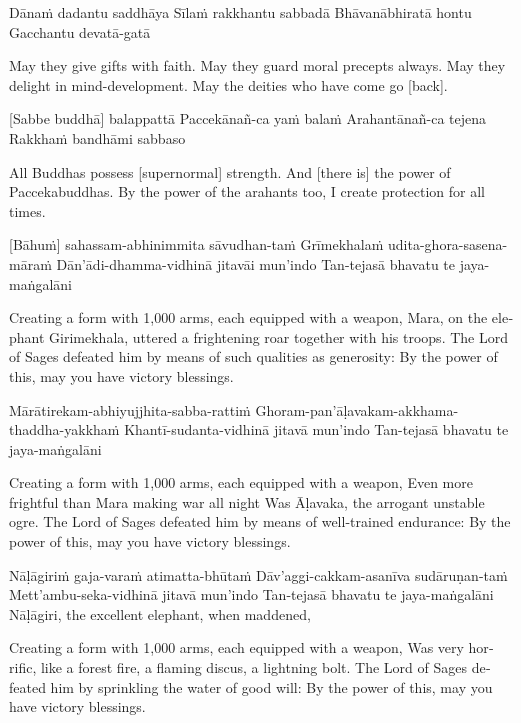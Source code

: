 Dānaṁ dadantu saddhāya
Sīlaṁ rakkhantu sabbadā
Bhāvanābhiratā hontu
Gacchantu devatā-gatā

\begin{english}
  May they give gifts with faith.
  May they guard moral precepts always.
  May they delight in mind-development.
  May the deities who have come go [back].
\end{english}

[Sabbe buddhā] balappattā
Paccekānañ-ca yaṁ balaṁ
Arahantānañ-ca tejena
Rakkhaṁ bandhāmi sabbaso

\begin{english}
  All Buddhas possess [supernormal] strength.
  And [there is] the power of Paccekabuddhas.
  By the power of the arahants too,
  I create protection for all times.
\end{english}

\suttaRef{[MJG]}

[Bāhuṁ] sahassam-abhinimmita sāvudhan-taṁ
Grīmekhalaṁ udita-ghora-sasena-māraṁ
Dān’ādi-dhamma-vidhinā jitavāi mun’indo
Tan-tejasā bhavatu te jaya-maṅgalāni

\begin{english}
  Creating a form with 1,000 arms, each equipped with a weapon,
  Mara, on the elephant Girimekhala, uttered a frightening roar together with his troops.
  The Lord of Sages defeated him by means of such qualities as generosity:
  By the power of this, may you have victory blessings.
\end{english}

Mārātirekam-abhiyujjhita-sabba-rattiṁ
Ghoram-pan’āḷavakam-akkhama-thaddha-yakkhaṁ
Khantī-sudanta-vidhinā jitavā mun’indo
Tan-tejasā bhavatu te jaya-maṅgalāni

\begin{english}
  Creating a form with 1,000 arms, each equipped with a weapon,
  Even more frightful than Mara making war all night
  Was Āḷavaka, the arrogant unstable ogre.
  The Lord of Sages defeated him by means of well-trained endurance:
  By the power of this, may you have victory blessings.
\end{english}

Nāḷāgiriṁ gaja-varaṁ atimatta-bhūtaṁ
Dāv’aggi-cakkam-asanīva sudāruṇan-taṁ
Mett’ambu-seka-vidhinā jitavā mun’indo
Tan-tejasā bhavatu te jaya-maṅgalāni
Nāḷāgiri, the excellent elephant, when maddened,

\begin{english}
  Creating a form with 1,000 arms, each equipped with a weapon,
  Was very horrific, like a forest fire, a flaming discus, a lightning bolt.
  The Lord of Sages defeated him by sprinkling the water of good will:
  By the power of this, may you have victory blessings.
\end{english}

